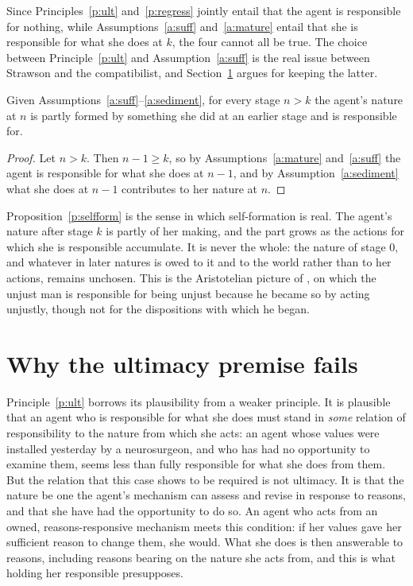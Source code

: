 \documentclass{situationist-preprint}
\begin{document}
Since Principles~\ref{p:ult} and~\ref{p:regress} jointly entail that the agent is responsible for nothing, while Assumptions~\ref{a:suff} and~\ref{a:mature} entail that she is responsible for what she does at $k$, the four cannot all be true. The choice between Principle~\ref{p:ult} and Assumption~\ref{a:suff} is the real issue between Strawson and the compatibilist, and Section~\ref{s:why} argues for keeping the latter.

\begin{proposition}\label{p:selfform}
Given Assumptions~\ref{a:suff}--\ref{a:sediment}, for every stage $n>k$ the agent's nature at $n$ is partly formed by something she did at an earlier stage and is responsible for.
\end{proposition}

\begin{proof}
Let $n>k$. Then $n-1\geq k$, so by Assumptions~\ref{a:mature} and~\ref{a:suff} the agent is responsible for what she does at $n-1$, and by Assumption~\ref{a:sediment} what she does at $n-1$ contributes to her nature at $n$.
\end{proof}

Proposition~\ref{p:selfform} is the sense in which self-formation is real. The agent's nature after stage $k$ is partly of her making, and the part grows as the actions for which she is responsible accumulate. It is never the whole: the nature of stage $0$, and whatever in later natures is owed to it and to the world rather than to her actions, remains unchosen. This is the Aristotelian picture of \citet[III.5]{AristotleNE}, on which the unjust man is responsible for being unjust because he became so by acting unjustly, though not for the dispositions with which he began.

\section{Why the ultimacy premise fails}\label{s:why}

Principle~\ref{p:ult} borrows its plausibility from a weaker principle. It is plausible that an agent who is responsible for what she does must stand in \emph{some} relation of responsibility to the nature from which she acts: an agent whose values were installed yesterday by a neurosurgeon, and who has had no opportunity to examine them, seems less than fully responsible for what she does from them. But the relation that this case shows to be required is not ultimacy. It is that the nature be one the agent's mechanism can assess and revise in response to reasons, and that she have had the opportunity to do so. An agent who acts from an owned, reasons-responsive mechanism meets this condition: if her values gave her sufficient reason to change them, she would. What she does is then answerable to reasons, including reasons bearing on the nature she acts from, and this is what holding her responsible presupposes.
\end{document}
